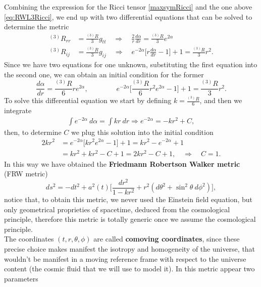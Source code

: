 Combining the expression for the Ricci tensor \eqref{maxsymRicci} and the one above \eqref{eq:RWL3Ricci}, we end up with two differential equations that can be solved to determine the metric
\begin{align*}
    ^{(3)}R_{rr}&=\frac{^{(3)}R}{3}g_{tt}\quad\Rightarrow\quad\boxed{\frac{2}{r}\frac{d\alpha}{dr}=\frac{^{(3)}R}{3}e^{2\alpha}}\\ ^{(3)}R_{ij}&=\frac{^{(3)}R}{3}g_{ij}\quad\Rightarrow\quad \boxed{e^{-2\alpha}\bigg[r\frac{d\alpha}{dr}-1\bigg]+1=\frac{^{(3)}R}{3}r^2}.
\end{align*}
Since we have two equations for one unknown, substituting the first equation into the second one, we can obtain an initial condition for the former
\begin{equation*}
    \frac{d\alpha}{dr}=\frac{^{(3)}R}{6}re^{2\alpha},\qquad\qquad e^{-2\alpha}\bigg[\frac{^{(3)}R}{6}r^2e^{2\alpha}-1\bigg]+1=\frac{^{(3)}R}{3}r^2.
\end{equation*}
To solve this differential equation we start by defining $k=\frac{^{(3)}R}{6}$, and then we integrate
\begin{align*}
    \int e^{-2\alpha}\ d\alpha=\int kr\ dr \Rightarrow e^{-2\alpha}=-kr^2+C,
\end{align*}
then, to determine $C$ we plug this solution into the initial condition
\begin{align*}
    2kr^2&=e^{-2\alpha}\bigg[kr^2e^{2\alpha}-1\bigg]+1=kr^2-e^{-2\alpha}+1\\
       &=kr^2+kr^2-C+1=2kr^2-C+1,\quad \Rightarrow\quad C=1.
\end{align*}    
In this way we have obtained the \textbf{Friedmann Robertson Walker metric} (FRW metric)
\begin{equation}\label{eq:RWMetric}
    ds^2=-dt^2+a^2(t)\bigg[\frac{dr^2}{1-kr^2}+r^2(d\theta^2+\sin^2\theta\ d\phi^2)\bigg],
\end{equation}
notice that, to obtain this metric, we never used the Einstein field equation, but only geometrical proprieties of spacetime, deduced from the cosmological principle, therefore this metric is totally generic once we assume the cosmological principle.\\
The coordinates $(t,r,\theta,\phi)$ are called \textbf{comoving coordinates}, since these precise choice makes manifest the isotropy and homogeneity of the universe, that wouldn't be manifest in a moving reference frame with respect to the universe content (the cosmic fluid that we will use to model it).
In this metric appear two parameters
